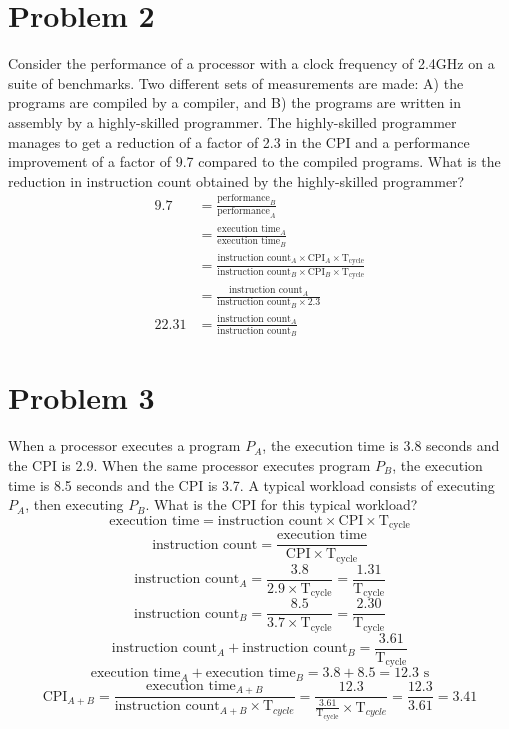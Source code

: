 \documentclass[10pt,letterpaper]{article}
\begin{document}

\section{Problem 2}
Consider the performance of a processor with a clock frequency of 2.4GHz on a suite of benchmarks. Two different sets of measurements are made: A) the programs are compiled by a compiler, and B) the programs are written in assembly by a highly-skilled programmer. The highly-skilled programmer manages to get a reduction of a factor of 2.3 in the CPI and a performance improvement of a factor of 9.7 compared to the compiled programs. What is the reduction in instruction count obtained by the highly-skilled programmer?
\begin{equation*}\begin{split}
9.7 & = \frac{\text{performance}_B}{\text{performance}_A} \\
& = \frac{\text{execution time}_A}{\text{execution time}_B} \\
& = \frac{\text{instruction count}_A \times \text{CPI}_A \times \text{T}_{\text{cycle}}}{\text{instruction count}_B \times \text{CPI}_B \times \text{T}_{\text{cycle}}} \\
& = \frac{\text{instruction count}_A}{\text{instruction count}_B \times 2.3} \\
\boxed{22.31} &= \frac{\text{instruction count}_A}{\text{instruction count}_B}
\end{split}\end{equation*}


\section{Problem 3}
When a processor executes a program $P_A$, the execution time is 3.8 seconds and the CPI is 2.9. When the same processor executes program $P_B$, the execution time is 8.5 seconds and the CPI is 3.7. A typical workload consists of executing $P_A$, then executing $P_B$. What is the CPI for this typical workload?
\[\text{execution time} = \text{instruction count} \times \text{CPI} \times \text{T}_{\text{cycle}}\]
\[\text{instruction count} = \frac{\text{execution time}}{\text{CPI}\times\text{T}_{\text{cycle}}}\]
\[\text{instruction count}_A = \frac{3.8}{2.9\times\text{T}_{\text{cycle}}} = \frac{1.31}{\text{T}_{\text{cycle}}}\]
\[\text{instruction count}_B = \frac{8.5}{3.7\times\text{T}_{\text{cycle}}} = \frac{2.30}{\text{T}_{\text{cycle}}}\]
\[\text{instruction count}_A + \text{instruction count}_B = \frac{3.61}{\text{T}_{\text{cycle}}}\]
\[\text{execution time}_A + \text{execution time}_B = 3.8 + 8.5 = 12.3 \text{ s}\]
\[\text{CPI}_{A+B} = \frac{\text{execution time}_{A+B}}{\text{instruction count}_{A+B}\times \text{T}_{cycle}} = \frac{12.3}{\frac{3.61}{\text{T}_{\text{cycle}}}\times \text{T}_{cycle}} = \frac{12.3}{3.61} = \boxed{3.41}\]
\pagebreak
\end{document}
